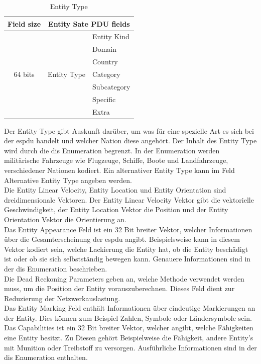 \begin{table}[H]
	\centering
	\begin{tabular}{|c|c|l|}
		\hline
		Field size               & \multicolumn{2}{c|}{Entity Sate PDU fields} \\ \hline
		\multirow{7}{*}{64 bits} & \multirow{7}{*}{Entity Type}  & Entity Kind \\ \cline{3-3} 
		&                               & Domain      \\ \cline{3-3} 
		&                               & Country     \\ \cline{3-3} 
		&                               & Category    \\ \cline{3-3} 
		&                               & Subcategory \\ \cline{3-3} 
		&                               & Specific    \\ \cline{3-3} 
		&                               & Extra       \\ \hline
	\end{tabular}
\caption[Entity Type ]{Entity Type\cite{SISOStandardsActivityCommitteeoftheIEEEComputerSociety.}}
\label{type}

\end{table}
Der Entity Type gibt Auskunft darüber, um was für eine spezielle Art es sich bei der \ac{espdu} handelt und welcher Nation diese angehört. Der Inhalt des Entity Type wird durch die \ac{dis} Enumeration begrenzt. In der Enumeration werden militärische Fahrzeuge wie Flugzeuge, Schiffe, Boote und Landfahrzeuge, verschiedener Nationen kodiert. Ein alternativer Entity Type kann im Feld \glqq Alternative Entity Type\grqq{} angeben werden.\\
Die  \glqq Entity Linear Velocity\grqq{}, \glqq Entity Location\grqq{} und \glqq Entity Orientation\grqq{} sind  dreidimensionale Vektoren. Der  \glqq Entity Linear Velocity\grqq{} Vektor gibt die vektorielle Geschwindigkeit, der \glqq Entity Location\grqq{} Vektor die Position und der \glqq Entity Orientation\grqq{} Vektor die Orientierung an. \\
Das  \glqq Entity Appearance\grqq{} Feld ist ein 32 Bit breiter Vektor, welcher Informationen über die Gesamterscheinung der \ac{espdu} angibt. Beispielsweise kann in diesem Vektor kodiert sein, welche Lackierung die Entity hat, ob die Entity beschädigt ist oder ob sie sich selbstständig bewegen kann. Genauere Informationen sind in der \ac{dis} Enumeration beschrieben.\\
 Die  \glqq Dead Reckoning Parameters\grqq{}  geben an, welche Methode verwendet werden muss, um die Position der Entity vorauszuberechnen. Dieses Feld dient zur Reduzierung der Netzwerkauslastung.\\
 Das \glqq Entity Marking\grqq{} Feld enthält Informationen über eindeutige Markierungen an der Entity. Dies können zum Beispiel Zahlen, Symbole oder Ländersymbole sein.\\ Das \glqq Capabilities\grqq{} ist ein 32 Bit breiter Vektor, welcher angibt, welche Fähigkeiten eine Entity besitzt. Zu Diesen  gehört Beispielweise die 
Fähigkeit, andere Entity's mit Munition oder Treibstoff zu versorgen. Ausführliche Informationen sind in der \ac{dis} Enumeration enthalten.

